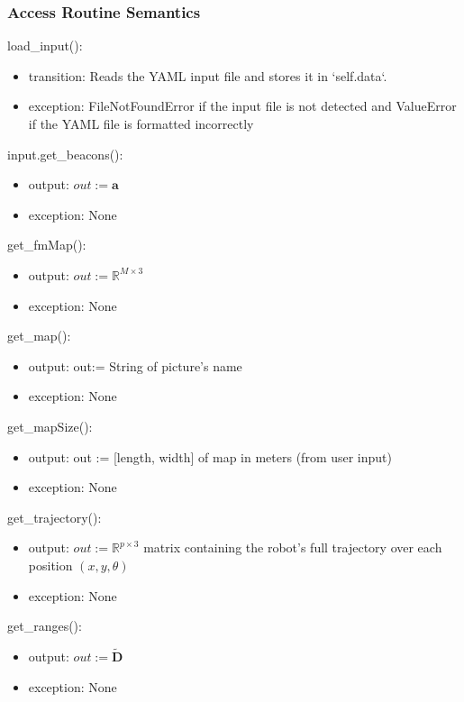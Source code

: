\documentclass[12pt, titlepage]{article}
\begin{document}
\subsubsection{Access Routine Semantics}

\noindent load\_input():
\begin{itemize}
  \item transition: Reads the YAML input file and stores it in `self.data`.
    \item exception: FileNotFoundError if the input file is not detected and ValueError if the YAML file is formatted incorrectly
\end{itemize}

\noindent input.get\_beacons():
\begin{itemize}
    \item output: $out:=\mathbf{a}$
    \item exception: None
\end{itemize}

\noindent get\_fmMap():
\begin{itemize}
    \item output: $out:= \mathbb{R}^{M \times 3}$
    \item exception: None
\end{itemize}

\noindent get\_map():
\begin{itemize}
    \item output: out:=  String of picture's name  
    \item exception: None
\end{itemize}

\noindent get\_mapSize():
\begin{itemize}
  \item output: out := [length, width] of map in meters (from user input)
  \item exception: None
\end{itemize}

\noindent get\_trajectory():
\begin{itemize}
  \item output: $out := \mathbb{R}^{p\times 3}$ matrix containing the robot's full trajectory over each position $(x, y, \theta)$
  \item exception: None
\end{itemize}

\noindent get\_ranges():
\begin{itemize}
    \item output: $out:=\mathbf{\tilde{D}}$
    \item exception: None
\end{itemize}
\end{document}
